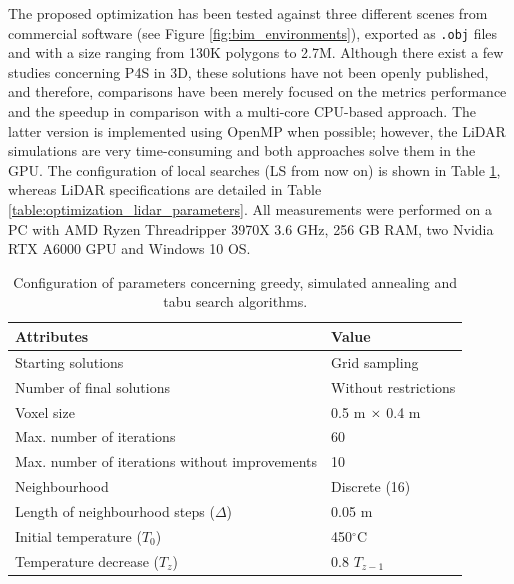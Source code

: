 The proposed optimization has been tested against three different scenes from commercial software (see Figure \ref{fig:bim_environments}), exported as \verb|.obj| files and with a size ranging from 130K polygons to 2.7M. Although there exist a few studies concerning P4S in 3D, these solutions have not been openly published, and therefore, comparisons have been merely focused on the metrics performance and the speedup in comparison with a multi-core CPU-based approach. The latter version is implemented using OpenMP when possible; however, the LiDAR simulations are very time-consuming and both approaches solve them in the GPU. The configuration of local searches (LS from now on) is shown in Table \ref{table:local_search_settings}, whereas LiDAR specifications are detailed in Table \ref{table:optimization_lidar_parameters}. All measurements were performed on a PC with AMD Ryzen Threadripper 3970X 3.6 GHz, 256 GB RAM, two Nvidia RTX A6000 GPU and Windows 10 OS. 

\renewcommand{\arraystretch}{1.15}
\begin{table}[hb]
\caption{Configuration of parameters concerning greedy, simulated annealing and tabu search algorithms.}
\label{table:local_search_settings}
\begin{tabular}{@{}ll@{}}
\toprule
\textbf{Attributes} & \textbf{Value}\\
\midrule
Starting solutions & Grid sampling\\
Number of final solutions & Without restrictions\\
Voxel size & 0.5 \si{\meter} $\times\hspace{1mm}$0.4 \si{\meter}\\
\midrule
Max. number of iterations & 60\\
Max. number of iterations without improvements & 10\\
\midrule
Neighbourhood & Discrete (16)\\
Length of neighbourhood steps ($\Delta$) & 0.05 $\si{\meter}$\\
\midrule
Initial temperature ($T_0$) & 450$^{\circ}$C\\
Temperature decrease ($T_z$) & 0.8 $T_{z-1}$\\
\bottomrule
\end{tabular}
\end{table}
\renewcommand{\arraystretch}{1}

